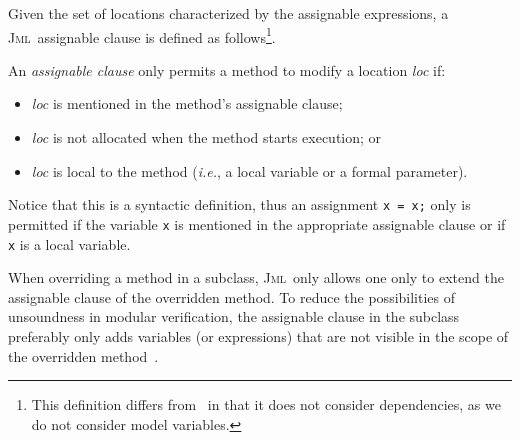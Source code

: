 \documentclass[a4paper]{llncs}
\newcommand{\defn}[1]{\:\hat{#1}\:}
\newcommand{\jml}{\textsc{Jml}}
\begin{document}
Given the set of locations characterized by the assignable
expressions, a \jml\ assignable clause is defined as
follows\footnote{This definition differs
from~\cite{LeavensBR00} in that it does not consider dependencies, 
as we do not consider model variables.}.
\begin{definition}
\label{def-mod}
An \emph{assignable clause} only permits a method to modify a location
\emph{loc} if:
\begin{itemize}
\item \emph{loc} is mentioned in the method's assignable
clause;
\item \emph{loc} is not allocated when the method starts execution; or
\item \emph{loc} is local to the method (\emph{i.e.}, a local
variable or a formal parameter).
\end{itemize}
\end{definition}

Notice that this is a syntactic definition, thus an assignment
\texttt{x = x;} only is permitted if the 
variable \texttt{x} is mentioned in the appropriate assignable clause
or if \texttt{x} is a local variable.

When overriding a method in a subclass, \jml\ only allows one only to
extend the assignable clause of the overridden method. To reduce the
possibilities of unsoundness in modular verification, the assignable
clause in the subclass preferably only adds variables (or expressions) 
that are not visible in the scope of the overridden
method~\cite{LeinoNS00,Leino98}.




\end{document}
